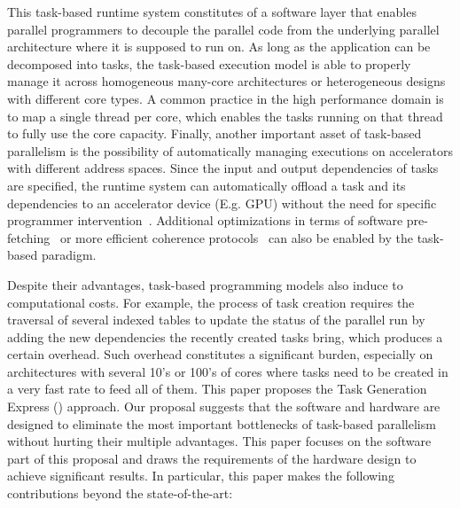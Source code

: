 This task-based runtime system constitutes of a software layer that enables parallel programmers to decouple the parallel code from the underlying parallel architecture where it is supposed to run on.
As long as the application can be decomposed into tasks, the task-based execution model is able to properly manage it across homogeneous many-core architectures or heterogeneous designs with different core types. 
A common practice in the high performance domain is to map a single thread per core, which enables the tasks running on that thread to fully use the core capacity. 
Finally, another important asset of task-based parallelism is the possibility of automatically managing executions on accelerators with different address spaces. 
Since the input and output dependencies of tasks are specified, the runtime system can automatically offload a task and its dependencies to an accelerator device (E.g. GPU) without the need for specific programmer intervention~\cite{Bueno:IPDPS2012}.
Additional optimizations in terms of software pre-fetching~\cite{Papaefstathiou2013} or more efficient coherence protocols~\cite{Manivannan2014} can also be enabled by the task-based paradigm.

Despite their advantages, task-based programming models also induce to computational costs.
For example, the process of task creation requires the traversal of several indexed tables to update the status of the parallel run by adding the new dependencies the recently created tasks bring, which produces a certain overhead.
Such overhead constitutes a significant burden, especially on architectures with several 10's or 100's of cores where tasks need to be created in a very fast rate to feed all of them.
This paper proposes the Task Generation Express ({\proposal}) approach. 
Our proposal suggests that the software and hardware are designed to eliminate the most important bottlenecks of task-based parallelism without hurting their multiple advantages. 
This paper focuses on the software part of this proposal and draws the requirements of the hardware design to achieve significant results.
In particular, this paper makes the following contributions beyond the state-of-the-art:


